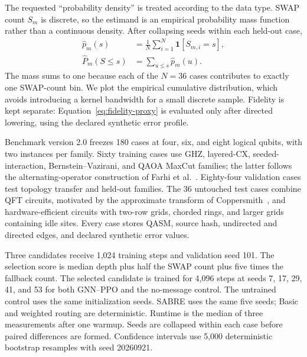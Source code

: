 \documentclass[conference]{IEEEtran}
\begin{document}
The requested ``probability density'' is treated according to the data type.
SWAP count $S_m$ is discrete, so the estimand is an empirical probability mass
function rather than a continuous density. After collapsing seeds within each
held-out case,
\begin{equation}
 \begin{aligned}
 \widehat p_m(s)&=\frac{1}{N}\sum_{i=1}^{N}
 \mathbf 1\!\left[S_{m,i}=s\right],\\
 \widehat P_m(S\leq s)&=\sum_{u\leq s}\widehat p_m(u).
 \end{aligned}
 \label{eq:swap-pmf}
\end{equation}
The mass sums to one because each of the $N=36$ cases contributes to exactly
one SWAP-count bin. We plot the empirical cumulative distribution, which avoids
introducing a kernel bandwidth for a small discrete sample. Fidelity is kept
separate: Equation~\eqref{eq:fidelity-proxy} is evaluated only after directed
lowering, using the declared synthetic error profile.

Benchmark version 2.0 freezes 180 cases at four, six, and eight logical
qubits, with two instances per family. Sixty training cases use GHZ,
layered-CX, seeded-interaction, Bernstein--Vazirani, and QAOA MaxCut families;
the latter follows the alternating-operator construction of
Farhi et al.~\cite{farhi2014qaoa}. Eighty-four validation cases test topology transfer and
held-out families. The 36 untouched test cases combine QFT circuits, motivated
by the approximate transform of Coppersmith~\cite{coppersmith2002qft}, and
hardware-efficient circuits with two-row grids, chorded rings, and larger
grids containing idle sites. Every case stores QASM, source hash, undirected
and directed edges, and declared synthetic error values.

Three candidates receive 1,024 training steps and validation seed 101. The
selection score is median depth plus half the SWAP count plus five times the
fallback count. The selected candidate is trained for 4,096 steps at seeds 7,
17, 29, 41, and 53 for both GNN--PPO and the no-message control. The untrained
control uses the same initialization seeds. SABRE uses the same five seeds;
Basic and weighted routing are deterministic. Runtime is the median of three
measurements after one warmup. Seeds are collapsed within each case before
paired differences are formed. Confidence intervals use 5,000 deterministic
bootstrap resamples with seed 20260921.
\end{document}
